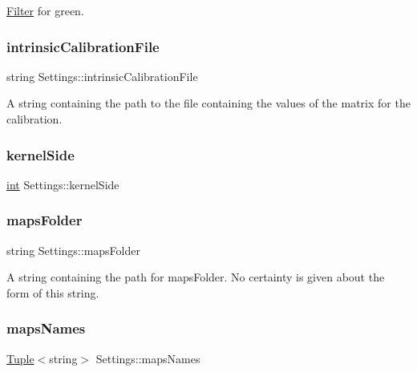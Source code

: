 \mbox{\hyperlink{class_filter}{Filter}} for green. 

\mbox{\label{class_settings_a634e9900615e8d5b46b08e0fc86d67a5}} 
\subsubsection{\texorpdfstring{intrinsicCalibrationFile}{intrinsicCalibrationFile}}
{\footnotesize\ttfamily string Settings\+::intrinsic\+Calibration\+File}



A string containing the path to the file containing the values of the matrix for the calibration. 

\mbox{\label{class_settings_a376418be10e2c1067b2d03c08e7b6a92}} 
\subsubsection{\texorpdfstring{kernelSide}{kernelSide}}
{\footnotesize\ttfamily \mbox{\hyperlink{draw_8hh_aa620a13339ac3a1177c86edc549fda9b}{int}} Settings\+::kernel\+Side}

\mbox{\label{class_settings_aeddfd4457036a14cb0a48d50d9e6ccfe}} 
\subsubsection{\texorpdfstring{mapsFolder}{mapsFolder}}
{\footnotesize\ttfamily string Settings\+::maps\+Folder}



A string containing the path for maps\+Folder. No certainty is given about the form of this string. 

\mbox{\label{class_settings_a4a464c938e96639861dc2deb773a2fb8}} 
\subsubsection{\texorpdfstring{mapsNames}{mapsNames}}
{\footnotesize\ttfamily \mbox{\hyperlink{class_tuple}{Tuple}}$<$string$>$ Settings\+::maps\+Names}



